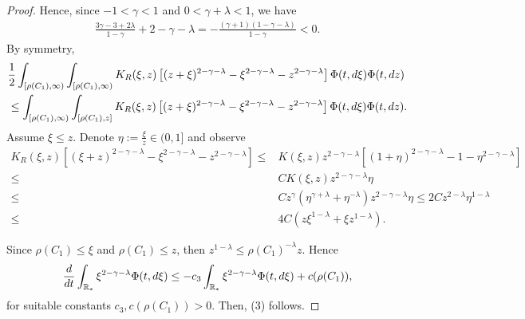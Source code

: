 \documentclass[11pt]{article}
\numberwithin{equation}{section}
\theoremstyle{plain}
\newcommand{\der}{\textup{d}}
\begin{document}
\begin{proof}
Hence, since $-1 < \gamma <1$ and $0 < \gamma + \lambda <1 $, we have
\begin{align*}
    \frac{3\gamma-3+2\lambda}{1-\gamma} + 2-\gamma -\lambda=- \frac{(\gamma+1)(1-\gamma-\lambda)}{1-\gamma } <0.
    \end{align*}
By symmetry, 
\begin{align*}
   &\frac{1}{2}\int_{[ \rho(C_1), \infty)} \int_{[ \rho(C_1), \infty)}K_R(\xi,z) \left[(z+\xi)^{2-\gamma -\lambda }- \xi^{2-\gamma -\lambda}-z^{2-\gamma -\lambda} \right] \Phi(t, \der\xi)\Phi(t,\der z) \\
   &\leq  \int_{[ \rho(C_1), \infty)} \int_{[\rho(C_1), z]} K_R(\xi,z) \left[(z+\xi)^{2-\gamma -\lambda }- \xi^{2-\gamma -\lambda}-z^{2-\gamma -\lambda} \right] \Phi(t,\der  \xi)\Phi(t,\der z).
\end{align*}
Assume $\xi\leq z$.  Denote $\eta:=\frac{\xi}{z}\in(0,1]$ and observe
\begin{align}\label{moments larger than one}
K_{R}(\xi,z)[(\xi+z)^{2-\gamma-\lambda}-\xi^{2-\gamma-\lambda}-z^{2-\gamma-\lambda}]\leq & K(\xi,z) z^{2-\gamma-\lambda}[(1+\eta)^{2-\gamma-\lambda}-1-\eta^{2-\gamma-\lambda}]\nonumber\\
\leq & C   K(\xi,z)z^{2-\gamma-\lambda}\eta \nonumber \nonumber\\
\leq& C z^{\gamma}(\eta^{\gamma+\lambda}+\eta^{-\lambda}) z^{2-\gamma-\lambda}\eta \leq 2C z^{2-\lambda}\eta^{1-\lambda}\nonumber \\
\leq & 4C (z\xi^{1-\lambda}+\xi z^{1-\lambda}).
\end{align}

Since $\rho(C_1)\leq \xi$ and $\rho(C_1)\leq z$, then $z^{1-\lambda}\leq\rho(C_1)^{-\lambda}z$. Hence 
\[
\frac{d }{dt } \int_{\mathbb R_*} \xi^{2-\gamma-\lambda} \Phi(t, \der \xi) \leq - c_3 \int_{\mathbb R_*} \xi^{2-\gamma-\lambda} \Phi(t, \der \xi) + c(\rho(C_1)),
\]
for suitable constants $c_3, c(\rho(C_1))>0$. Then, (3) follows.
\end{proof}
\end{document}
